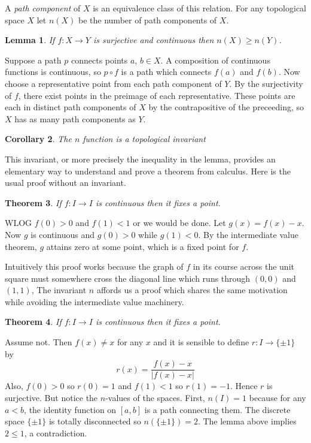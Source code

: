\documentclass[letterpaper]{article}
\newtheorem{theorem}{Theorem}[section]
\newtheorem{lemma}[theorem]{Lemma}
\newtheorem{corollary}[theorem]{Corollary}
\newenvironment{proof}[1][Proof]{\begin{trivlist}
\item[\hskip \labelsep {\bfseries #1}]}{\end{trivlist}}
\begin{document}
A \emph{path component} of $X$ is an equivalence class of this
relation. For any topological space $X$ let $n(X)$ be the number
of path components of $X$.

\begin{lemma}
If $f \colon X \rightarrow Y$ is surjective and continuous then
$n(X) \geq n(Y)$.
\end{lemma}
\begin{proof}
Suppose a path $p$ connects points $a$, $b \in X$. A composition
of continuous functions is continuous, so $p \circ f$ is a path
which connects $f(a)$ and $f(b)$. Now choose a representative point
from each path component of $Y$. By the surjectivity of $f$, there
exist points in the preimage of each representative. These points
are each in distinct path components of $X$ by the contrapositive
of the preceeding, so $X$ has as many path components as $Y$.
\end{proof}

\begin{corollary}
The $n$ function is a topological invariant
\end{corollary}

This invariant, or more precisely the inequality in the lemma,
provides an elementary way to understand and prove a theorem from
calculus. Here is the usual proof without an invariant.

\begin{theorem}
If $f \colon I \rightarrow I$ is continuous then it fixes a point.
\end{theorem}
\begin{proof}
WLOG $f(0) > 0$ and $f(1) < 1$ or we would be done. Let $g(x) =
f(x) - x$. Now $g$ is continuous and $g(0) > 0$ while $g(1) < 0$.
By the intermediate value theorem, $g$ attains zero at some point,
which is a fixed point for $f$.
\end{proof}

Intuitively this proof works because the graph of $f$ in its course
across the unit square must somewhere cross the diagonal line which
runs through $(0, 0)$ and $(1, 1)$, The invariant $n$ affords us a
proof which shares the same motivation while avoiding the intermediate
value machinery.

\begin{theorem}
If $f \colon I \rightarrow I$ is continuous then it fixes a point.
\end{theorem}
\begin{proof}
Assume not. Then $f(x) \neq x$ for any $x$ and it is sensible to
define $r \colon I \rightarrow \{\pm 1\}$ by \[ r(x) = \frac{f(x)
- x}{|f(x) - x|} \] Also, $f(0) > 0$ so $r(0) = 1$ and $f(1) < 1$
so $r(1) = -1$. Hence $r$ is surjective. But notice the $n$-values
of the spaces. First, $n(I) = 1$ because for any $a < b$, the
identity function on $[a, b]$ is a path connecting them. The discrete
space $\{\pm 1\}$ is totally disconnected so $n(\{\pm 1\}) = 2$.
The lemma above implies $2 \leq 1$, a contradiction.
\end{proof}
\end{document}
